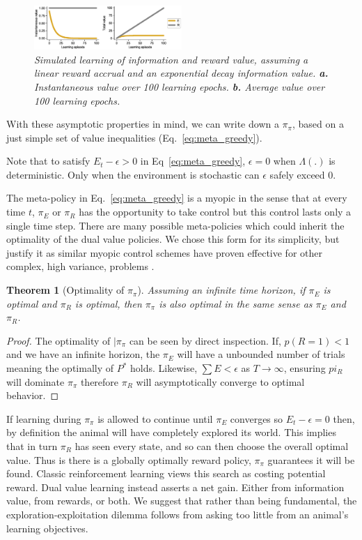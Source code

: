 \documentclass[9pt,twocolumn,twoside]{pnas-new}
\newtheorem{theorem}{Theorem}
\begin{document}
\begin{figure}
\includegraphics[width=0.5\textwidth]{figures/simple_E_R_timecourse.eps}
\caption{
    \textit{Simulated learning of information and reward value, assuming a linear reward accrual and an exponential decay information value. 
    \textbf{a.} Instantaneous value over 100 learning epochs.  
    \textbf{b.} Average value over 100 learning epochs.}
}
\label{fig:simple_E_R_timecourse}
\end{figure}


With these asymptotic properties in mind, we can write down a $\pi_{\pi}$, based on a just simple set of value inequalities (Eq.~\ref{eq:meta_greedy}). 

Note that to satisfy $E_t - \epsilon > 0$ in Eq~\ref{eq:meta_greedy}, $\epsilon = 0$ when $\Lambda(.)$ is deterministic. Only when the environment is stochastic can $\epsilon$ safely exceed 0.

The meta-policy in Eq.~\ref{eq:meta_greedy} is a myopic in the sense that at every time $t$, $\pi_E$ or $\pi_R$ has the opportunity to take control but this control lasts only a single time step. There are many possible meta-policies which could inherit the optimality of the dual value policies. We chose this form for its simplicity, but justify it as similar myopic control schemes have proven effective for other complex, high variance, problems \cite{Hocker2019}.

\begin{theorem}[Optimality of $\pi_{\pi}$] \label{theorem:meta}
    Assuming an infinite time horizon, if $\pi_E$ is optimal and $\pi_R$ is optimal, then $\pi_{\pi}$ is also optimal in the same sense as $\pi_E$ and $\pi_R$.
\end{theorem}
\begin{proof}
    The optimality of $|\pi_{\pi}$ can be seen by direct inspection. If, $p(R = 1) < 1$ and we have an infinite horizon, the $\pi_E$ will have a unbounded number of trials meaning the optimally of $P^*$ holds. Likewise, $\sum E < \epsilon$ as $T \rightarrow \infty$, ensuring $pi_R$ will dominate $\pi_{\pi}$ therefore $\pi_R$ will asymptotically converge to optimal behavior.
\end{proof}

If learning during $\pi_{\pi}$ is allowed to continue until $\pi_E$ converges so $E_t - \epsilon = 0$ then, by definition the animal will have completely explored its world. This implies that in turn $\pi_R$ has seen every state, and so can then choose the overall optimal value. Thus is there is a globally optimally reward policy, $\pi_{\pi}$ guarantees it will be found. Classic reinforcement learning views this search as costing potential reward. Dual value learning instead asserts a net gain. Either from information value, from rewards, or both. We suggest that rather than being fundamental, the exploration-exploitation dilemma follows from asking too little from an animal's learning objectives.
\end{document}
